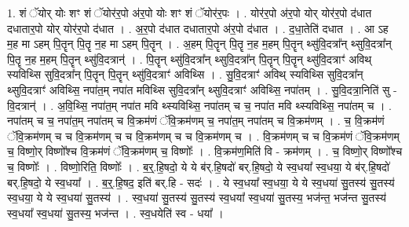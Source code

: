 \documentclass[17pt]{extarticle}
\begin{document}
1. शं ॅयोर् योः शꣳ शं ॅयोर॑र॒पो अ॑र॒पो योः शꣳ शं ॅयोर॑र॒पः । . योर॑र॒पो अ॑र॒पो योर् योर॑र॒पो द॑धात दधातार॒पो योर् योर॑र॒पो द॑धात । . अ॒र॒पो द॑धात दधातार॒पो अ॑र॒पो द॑धात । . द॒धा॒तेति॑ दधात । . आ ऽह म॒ह मा ऽहम् पि॒तॄन् पि॒तॄ न॒ह मा ऽहम् पि॒तॄन् । . अ॒हम् पि॒तॄन् पि॒तॄ न॒ह म॒हम् पि॒तॄन् थ्सु॑वि॒दत्रा᳚न् थ्सुवि॒दत्रा᳚न् पि॒तॄ न॒ह म॒हम् पि॒तॄन् थ्सु॑वि॒दत्रान्॑ । . पि॒तॄन् थ्सु॑वि॒दत्रा᳚न् थ्सुवि॒दत्रा᳚न् पि॒तॄन् पि॒तॄन् थ्सु॑वि॒दत्राꣳ॑ अविथ् स्यविथ्सि सुवि॒दत्रा᳚न् पि॒तॄन् पि॒तॄन् थ्सु॑वि॒दत्राꣳ॑ अविथ्सि । . सु॒वि॒दत्राꣳ॑ अविथ् स्यविथ्सि सुवि॒दत्रा᳚न् थ्सुवि॒दत्राꣳ॑ अविथ्सि॒ नपा॑त॒म् नपा॑त मविथ्सि सुवि॒दत्रा᳚न् थ्सुवि॒दत्राꣳ॑ अविथ्सि॒ नपा॑तम् । . सु॒वि॒दत्रा॒निति॑ सु - वि॒दत्रान्॑ । . अ॒वि॒थ्सि॒ नपा॑त॒म् नपा॑त मवि थ्स्यविथ्सि॒ नपा॑तम् च च॒ नपा॑त मवि थ्स्यविथ्सि॒ नपा॑तम् च । . नपा॑तम् च च॒ नपा॑त॒म् नपा॑तम् च वि॒क्रम॑णं ॅवि॒क्रम॑णम् च॒ नपा॑त॒म् नपा॑तम् च वि॒क्रम॑णम् । . च॒ वि॒क्रम॑णं ॅवि॒क्रम॑णम् च च वि॒क्रम॑णम् च च वि॒क्रम॑णम् च च वि॒क्रम॑णम् च । . वि॒क्रम॑णम् च च वि॒क्रम॑णं ॅवि॒क्रम॑णम् च॒ विष्णो॒र् विष्णो᳚श्च वि॒क्रम॑णं ॅवि॒क्रम॑णम् च॒ विष्णोः᳚ । . वि॒क्रम॑ण॒मिति॑ वि - क्रम॑णम् । . च॒ विष्णो॒र् विष्णो᳚श्च च॒ विष्णोः᳚ । . विष्णो॒रिति॒ विष्णोः᳚ । . ब॒र्॒.हि॒षदो॒ ये ये ब॑र्.हि॒षदो॑ बर्.हि॒षदो॒ ये स्व॒धया᳚ स्व॒धया॒ ये ब॑र्.हि॒षदो॑ बर्.हि॒षदो॒ ये स्व॒धया᳚ । . ब॒र्॒.हि॒षद॒ इति॑ बर्.हि - सदः॑ । . ये स्व॒धया᳚ स्व॒धया॒ ये ये स्व॒धया॑ सु॒तस्य॑ सु॒तस्य॑ स्व॒धया॒ ये ये स्व॒धया॑ सु॒तस्य॑ । . स्व॒धया॑ सु॒तस्य॑ सु॒तस्य॑ स्व॒धया᳚ स्व॒धया॑ सु॒तस्य॒ भज॑न्त॒ भज॑न्त सु॒तस्य॑ स्व॒धया᳚ स्व॒धया॑ सु॒तस्य॒ भज॑न्त । . स्व॒धयेति॑ स्व - धया᳚ । \newline
\end{document}
